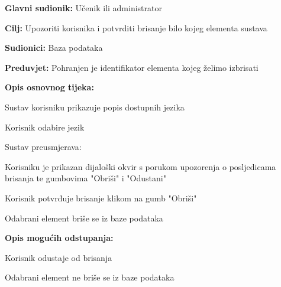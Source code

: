 \noindent {}
\begin{packed_item}

	\item \textbf{Glavni sudionik: } Učenik ili administrator
	\item \textbf{Cilj: } Upozoriti korisnika i potvrditi brisanje bilo kojeg elementa sustava
	\item \textbf{Sudionici: } Baza podataka
	\item \textbf{Preduvjet: } Pohranjen je identifikator elementa kojeg želimo izbrisati	
	\item  \textbf{Opis osnovnog tijeka:}
	
	\item[] \begin{packed_enum}

		\item Sustav korisniku prikazuje popis dostupnih jezika
		\item Korisnik odabire jezik
		\item Sustav preusmjerava:
		
		\item[] \begin{packed_item}

			\item Korisniku je prikazan dijaloški okvir s porukom upozorenja o posljedicama brisanja te gumbovima "Obriši" i "Odustani"
			\item Korisnik potvrđuje brisanje klikom na gumb "Obriši"
			\item Odabrani element briše se iz baze podataka
		
		\end{packed_item}

	\end{packed_enum}

	\item  \textbf{Opis mogućih odstupanja:}
	
	\item[] \begin{packed_item}

		\item[2.a] Korisnik odustaje od brisanja
		\item[] \begin{packed_enum}
			
			\item Odabrani element ne briše se iz baze podataka
			
		\end{packed_enum}
		
	\end{packed_item}
	
\end{packed_item}

